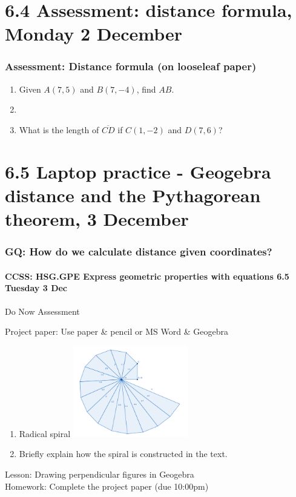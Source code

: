 \documentclass{beamer}
\begin{document}
  \section{6.4 Assessment: distance formula, Monday 2 December}
  \frame
  {
    \frametitle{Assessment: Distance formula (on looseleaf paper)}
    \begin{enumerate}
      \item Given $A(7,5)$ and $B(7,-4)$, find $AB$. \hspace{0.5cm}
        \vspace{0.5cm}
      \item 
      \item What is the length of $\overline{CD}$ if $C(1,-2)$ and $D(7,6)$?
    \end{enumerate}
  }

  \section{6.5 Laptop practice - Geogebra distance and the Pythagorean theorem, 3 December}
  \frame
  {
  \frametitle{GQ: How do we calculate distance given coordinates?}
  \framesubtitle{CCSS: HSG.GPE Express geometric properties with equations \hfill \alert{6.5 Tuesday 3 Dec}}
  
  Do Now Assessment
  \begin{block}{Project paper: Use paper \& pencil or MS Word \& Geogebra}
  \begin{enumerate}
    \item Radical spiral
    \includegraphics[width=5cm]{6-5CW_Radical-spiral.png}
    \item Briefly explain how the spiral is constructed in the text.
  \end{enumerate}
  \end{block}
  Lesson: Drawing perpendicular figures in Geogebra\\[0.25cm]
  Homework: Complete the project paper (due 10:00pm)
  }
\end{document}

